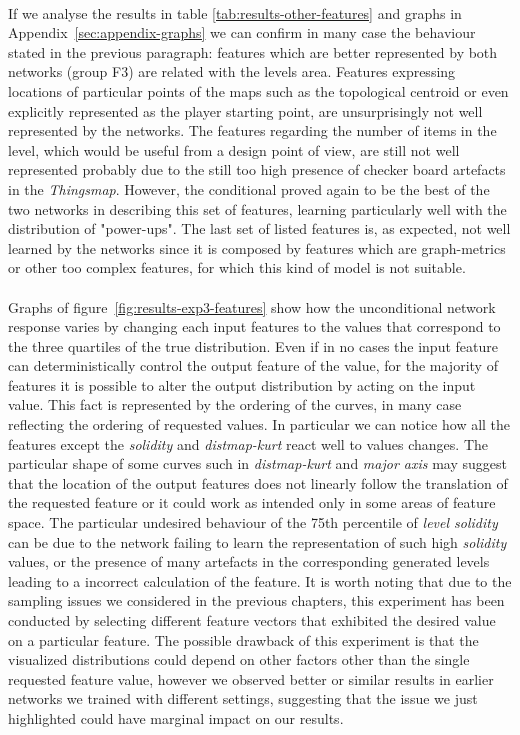 \paragraph{} If we analyse the results in table \ref{tab:results-other-features} and graphs in Appendix~\ref{sec:appendix-graphs} we can confirm in many case the behaviour stated in the previous paragraph: features which are better represented by both networks (group F3) are related with the levels area. Features expressing  locations of particular points of the maps such as the topological centroid or even explicitly represented as the player starting point, are unsurprisingly not well represented by the networks. The features regarding the number of items in the level, which would be useful from a design point of view, are still not well represented probably due to the still too high presence of checker board artefacts in the \textit{Thingsmap}. However, the conditional proved again to be the best of the two networks in describing this set of features, learning particularly well with the distribution of "power-ups". The last set of listed features is, as expected, not well learned by the networks since it is composed by features which are graph-metrics or other too complex features, for which this kind of model is not suitable.

\paragraph{} Graphs of figure~\ref{fig:results-exp3-features} show how the unconditional network response varies by changing each input features to the values that correspond to the three quartiles of the true distribution. Even if in no cases the input feature can deterministically control the output feature of the value, for the majority of features it is possible to alter the output distribution by acting on the input value. This fact is represented by the ordering of the curves, in many case reflecting the ordering of requested values.
In particular we can notice how all the features except the \textit{solidity} and \textit{distmap-kurt} react well to values changes. The particular shape of some curves such in \textit{distmap-kurt} and \textit{major axis} may suggest that the location of the output features does not linearly follow the translation of the requested feature or it could work as intended only in some areas of feature space. The particular undesired behaviour of the 75th percentile of \textit{level solidity} can be due to the network failing to learn the representation of such high \textit{solidity} values, or the presence of many artefacts in the corresponding generated levels leading to a incorrect calculation of the feature. 
It is worth noting that due to the sampling issues we considered in the previous chapters, this experiment has been conducted by selecting different feature vectors that exhibited the desired value on a particular feature. The possible drawback of this experiment is that the visualized distributions could depend on other factors other than the single requested feature value, however we observed better or similar results in earlier networks we trained with different settings, suggesting that the issue we just highlighted could have marginal impact on our results.


